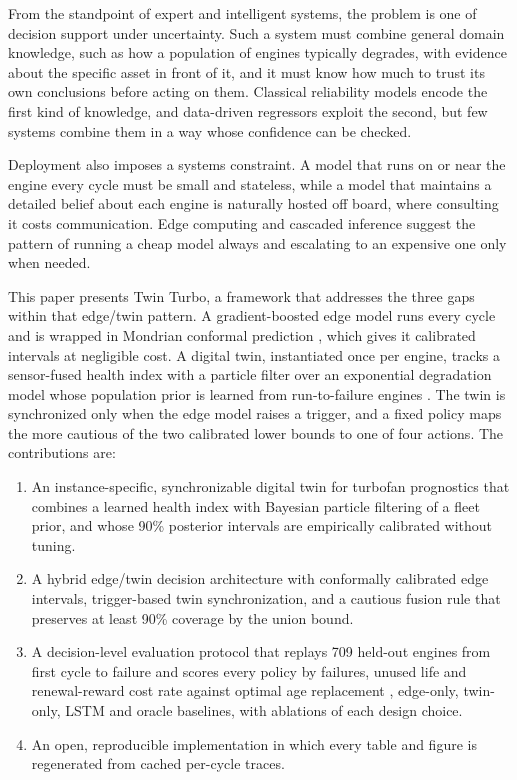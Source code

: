 \documentclass[preprint,12pt,authoryear]{elsarticle}
\begin{document}
From the standpoint of expert and intelligent systems, the problem is one of decision support under uncertainty. Such a system must combine general domain knowledge, such as how a population of engines typically degrades, with evidence about the specific asset in front of it, and it must know how much to trust its own conclusions before acting on them. Classical reliability models encode the first kind of knowledge, and data-driven regressors exploit the second, but few systems combine them in a way whose confidence can be checked.

Deployment also imposes a systems constraint. A model that runs on or near the engine every cycle must be small and stateless, while a model that maintains a detailed belief about each engine is naturally hosted off board, where consulting it costs communication. Edge computing \citep{shi2016edge} and cascaded inference \citep{teerapittayanon2016branchynet} suggest the pattern of running a cheap model always and escalating to an expensive one only when needed.

This paper presents Twin Turbo, a framework that addresses the three gaps within that edge/twin pattern. A gradient-boosted edge model runs every cycle and is wrapped in Mondrian conformal prediction \citep{vovk2005alrw,angelopoulos2021gentle}, which gives it calibrated intervals at negligible cost. A digital twin, instantiated once per engine, tracks a sensor-fused health index \citep{wang2008similarity} with a particle filter \citep{arulampalam2002tutorial,orchard2009particle} over an exponential degradation model whose population prior is learned from run-to-failure engines \citep{gebraeel2005residual}. The twin is synchronized only when the edge model raises a trigger, and a fixed policy maps the more cautious of the two calibrated lower bounds to one of four actions. The contributions are:
\begin{enumerate}
\item An instance-specific, synchronizable digital twin for turbofan prognostics that combines a learned health index with Bayesian particle filtering of a fleet prior, and whose 90\% posterior intervals are empirically calibrated without tuning.
\item A hybrid edge/twin decision architecture with conformally calibrated edge intervals, trigger-based twin synchronization, and a cautious fusion rule that preserves at least 90\% coverage by the union bound.
\item A decision-level evaluation protocol that replays 709 held-out engines from first cycle to failure and scores every policy by failures, unused life and renewal-reward cost rate against optimal age replacement \citep{barlow1960optimum}, edge-only, twin-only, LSTM and oracle baselines, with ablations of each design choice.
\item An open, reproducible implementation in which every table and figure is regenerated from cached per-cycle traces.
\end{enumerate}
\end{document}
